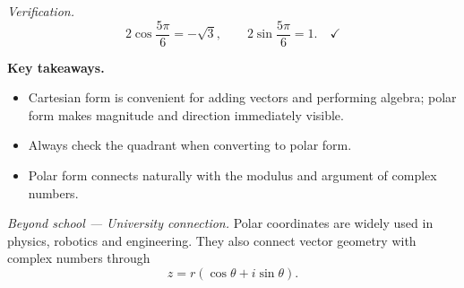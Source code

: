 \noindent\textit{Verification.}
\[
  2\cos\frac{5\pi}{6} = -\sqrt{3},
  \qquad
  2\sin\frac{5\pi}{6} = 1.  \quad\checkmark
\]

\vspace{0.8em}
\noindent\textbf{Key takeaways.}
\begin{itemize}[leftmargin=*,itemsep=2pt]
  \item Cartesian form is convenient for adding vectors and performing
        algebra; polar form makes magnitude and direction immediately
        visible.
  \item Always check the quadrant when converting to polar form.
  \item Polar form connects naturally with the modulus and argument
        of complex numbers.
\end{itemize}

\vspace{0.4em}
\noindent\textit{Beyond school --- University connection.}
Polar coordinates are widely used in physics, robotics and engineering.
They also connect vector geometry with complex numbers through
\[
  z = r(\cos\theta + i\sin\theta).
\]

\endgroup
